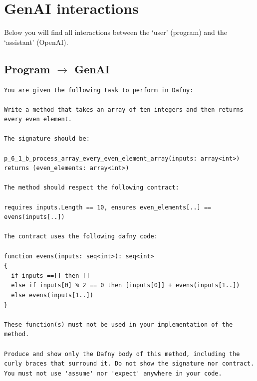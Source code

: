 \documentclass{article}
\begin{document}
\section*{GenAI interactions}
Below you will find all interactions between the `user' (program) and the `assistant' (OpenAI).
\subsection*{Program $\rightarrow$ GenAI}
\begin{lstlisting}
You are given the following task to perform in Dafny:

Write a method that takes an array of ten integers and then returns every even element.

The signature should be:

p_6_1_b_process_array_every_even_element_array(inputs: array<int>) returns (even_elements: array<int>)

The method should respect the following contract:

requires inputs.Length == 10, ensures even_elements[..] == evens(inputs[..])

The contract uses the following dafny code:

function evens(inputs: seq<int>): seq<int>
{
  if inputs ==[] then []
  else if inputs[0] % 2 == 0 then [inputs[0]] + evens(inputs[1..])
  else evens(inputs[1..])
}

These function(s) must not be used in your implementation of the method.

Produce and show only the Dafny body of this method, including the curly braces that surround it. Do not show the signature nor contract. You must not use 'assume' nor 'expect' anywhere in your code.
\end{lstlisting}
\end{document}
